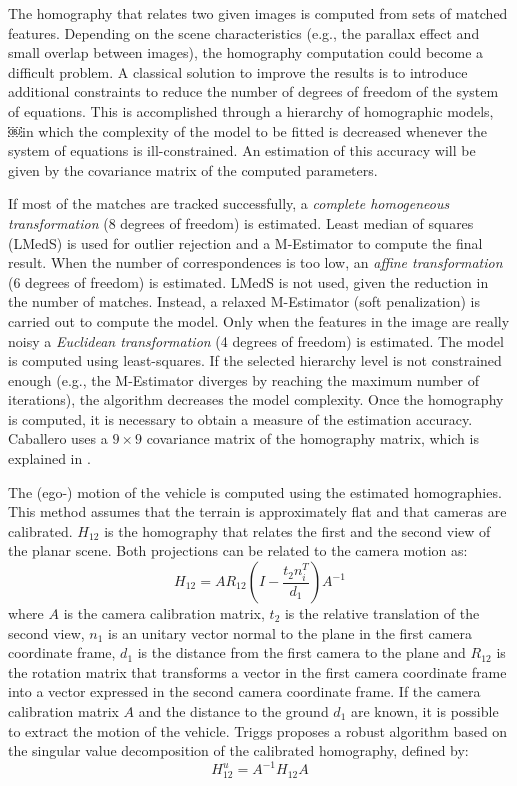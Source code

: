 The homography that relates two given images is computed from sets of matched features.
Depending on the scene characteristics (e.g., the parallax effect and small overlap between images), the homography computation could become a difficult problem. 
A classical solution to improve the results is to introduce additional constraints to reduce the number of degrees of freedom of the system of equations.
This is accomplished through a hierarchy of homographic models, ￼in which the complexity of the model to be fitted is decreased whenever the system of equations is ill-constrained.
An estimation of this accuracy will be given by the covariance matrix of the computed parameters.

If most of the matches are tracked successfully, a \textit{complete homogeneous transformation} (8 degrees of freedom) is estimated.
Least median of squares (LMedS) is used for outlier rejection and a M-Estimator  \cite{zhang1997parameter} to compute the final result.
When the number of correspondences is too low, an \textit{affine transformation} (6 degrees of freedom) is estimated.
LMedS is not used, given the reduction in the number of matches.
Instead, a relaxed M-Estimator (soft penalization) is carried out to compute the model.
Only when the features in the image are really noisy a \textit{Euclidean transformation} (4 degrees of freedom) is estimated.
The model is computed using least-squares.
If the selected hierarchy level is not constrained enough (e.g., the M-Estimator diverges by reaching the maximum number of iterations), the algorithm decreases the model complexity.
Once the homography is computed, it is necessary to obtain a measure of the estimation accuracy.
Caballero uses a $9 \times 9$ covariance matrix of the homography matrix, which is explained in \cite{Hartley2004}.

The (ego-) motion of the vehicle is computed using the estimated homographies.
This method assumes that the terrain is approximately flat and that cameras are calibrated.
$H_{12}$ is the homography that relates the first and the second view of the planar scene.
Both projections can be related to the camera motion as:
\begin{equation}
H_{12} = AR_{12}(I - \frac{t_2n_i^T}{d_1})A^{-1}
\end{equation}
where $A$ is the camera calibration matrix, $t_2$ is the relative translation of the second view, $n_1$ is an unitary vector normal to the plane in the first camera coordinate frame, $d_1$ is the distance from the first camera to the plane and $R_{12}$ is the rotation matrix that transforms a vector in the first camera coordinate frame into a vector expressed in the second camera coordinate frame.
If the camera calibration matrix $A$ and the distance to the ground $d_1$ are known, it is possible to extract the motion of the vehicle.
Triggs \cite{triggs1998autocalibration} proposes a robust algorithm based on the singular value decomposition of the calibrated homography, defined by:
\begin{equation}
H_{12}^{u} = A^{-1} H_{12} A
\end{equation}

